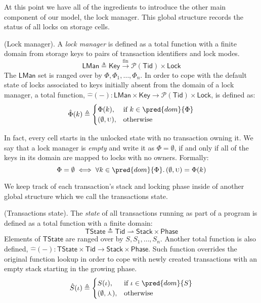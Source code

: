 At this point we have all of the ingredients to introduce the other main component of our model, the lock manager. This global structure records the status of all locks on storage cells.

\begin{defn}
	(Lock manager).
	A \emph{lock manager} is defined as a total function with a finite domain from storage keys to pairs of transaction identifiers and lock modes.
	\[
		\mathsf{LMan} \triangleq \mathsf{Key} \xrightarrow{\text{fin}} \mathcal{P}(\mathsf{Tid}) \times \mathsf{Lock}
	\]
	The $\mathsf{LMan}$ set is ranged over by $\Phi, \Phi_1, \ldots, \Phi_n$. In order to cope with the default state of locks associated to keys initially absent from the domain of a lock manager, a total function, $\hat{-}(-) : \mathsf{LMan} \times \mathsf{Key} \rightarrow \mathcal{P}(\mathsf{Tid}) \times \mathsf{Lock}$, is defined as:
	\[
		\hat{\Phi}(k)
			\triangleq
		\begin{cases}
			\Phi(k), & \text{if } k \in \pred{dom}{\Phi} \\
			(\emptyset, \textsc{u}), & \text{otherwise}
		\end{cases}
	\]	
\end{defn}
In fact, every cell starts in the unlocked state with no transaction owning it. We say that a lock manager is \textit{empty} and write it as $\Phi = \emptyset$, if and only if all of the keys in its domain are mapped to locks with no owners. Formally:
	\[
		\Phi = \emptyset \iff \forall k \in \pred{dom}{\Phi} \ldotp (\emptyset, \textsc{u}) = \Phi(k)
	\]

We keep track of each transaction's stack and locking phase inside of another global structure which we call the transactions state.
\begin{defn}
	(Transactions state).
	The \emph{state} of all transactions running as part of a program is defined as a total function with a finite domain:
	\[
		\mathsf{TState} \triangleq \mathsf{Tid} \rightharpoonup \mathsf{Stack} \times \mathsf{Phase}
	\]
	Elements of $\mathsf{TState}$ are ranged over by $S, S_1, \ldots, S_n$. Another total function is also defined, $\hat{-}(-) : \mathsf{TState} \times \mathsf{Tid} \rightarrow \mathsf{Stack} \times \mathsf{Phase}$. Such function overrides the original function lookup in order to cope with newly created transactions with an empty stack starting in the growing phase.
	\[
		\hat{S}(\iota)
			\triangleq
		\begin{cases}
			S(\iota), & \text{if } \iota \in \pred{dom}{S} \\
			(\emptyset, \curlywedge), & \text{otherwise}
		\end{cases}
	\]	
\end{defn}